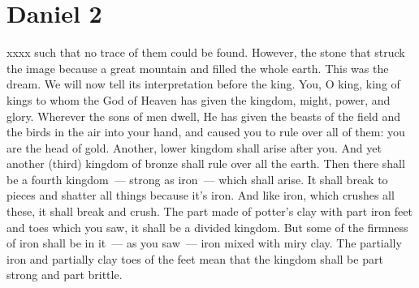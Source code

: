 \section{Daniel 2}\label{Daniel 2}
\begin{enumerate}
     xxxx such that no trace of them could be found. However, the stone that struck the image because a great mountain and filled the whole earth.%
     This was the dream. We will now tell its interpretation before the king.%
     You, O king, king of kings to whom the God of Heaven has given the kingdom, might, power, and glory.%
     Wherever the sons of men dwell, He has given the beasts of the field and the birds in the air into your hand, and caused you to rule over all of them: you are the head of gold.%
     Another, lower kingdom shall arise after you. And yet another (third) kingdom of bronze shall rule over all the earth.%
     Then there shall be a fourth kingdom~--- strong as iron~--- which shall arise. It shall break to pieces and shatter all things because it's iron. And like iron, which crushes all these, it shall break and crush.%
     The part made of potter's clay with part iron feet and toes which you saw, it shall be a divided kingdom. But some of the firmness of iron shall be in it~--- as you saw~--- iron mixed with miry clay.%
     The partially iron and partially clay toes of the feet mean that the kingdom shall be part strong and part brittle.%

\end{enumerate}
